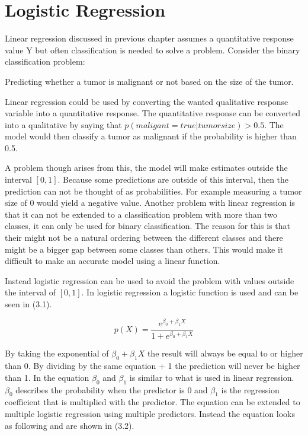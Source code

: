 \chapter{Logistic Regression}
\label{chp:logreg}
Linear regression discussed in previous chapter assumes a quantitative response value Y but often classification is needed to solve a problem. Consider the binary classification problem:
\begin{centering}
Predicting whether a tumor is malignant or not based on the size of the tumor.
\end{centering}
Linear regression could be used by converting the wanted qualitative response variable into a quantitative response. The quantitative response can be converted into a qualitative by saying that $p(maligant = true | tumorsize) > 0.5$. The model would then classify a tumor as malignant if the probability is higher than 0.5. 

A problem though arises from this, the model will make estimates outside the interval $[0,1]$. Because some predictions are outside of this interval, then the prediction can not be thought of as probabilities. For example measuring a tumor size of 0 would yield a negative value. Another problem with linear regression is that it can not be extended to a classification problem with more than two classes, it can only be used for binary classification. The reason for this is that their might not be a natural ordering between the different classes and there might be a bigger gap between some classes than others. This would make it difficult to make an accurate model using a linear function.

Instead logistic regression can be used to avoid the problem with values outside the interval of $[0,1]$. In logistic regression a logistic function is used and can be seen in (3.1).


\begin{equation}
	p(X) = \dfrac{e^{\beta_0 + \beta_1 X}}{1 + e^{\beta_0 + \beta_1 X}}
\end{equation}

By taking the exponential of $\beta_0 + \beta_1 X$ the result will always be equal to or higher than 0. By dividing by the same equation + 1 the prediction will never be higher than 1. In the equation $\beta_0$ and $\beta_1$ is similar to what is used in linear regression. $\beta_0$ describes the probability when the predictor is 0 and $\beta_1$ is the regression coefficient that is multiplied  with the predictor. The equation can be extended to multiple logistic regression using multiple predictors. Instead the equation looks as following and are shown in (3.2).

